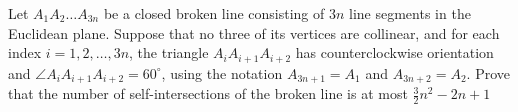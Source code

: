 Let \(A_{1}A_{2} \dots A_{3n}\) be a closed broken line consisting of \(3n\) line segments in the Euclidean plane. Suppose that no three of its vertices are collinear, and for each index \(i=1,2,\dots,3n\), the triangle \(A_{i}A_{i+1}A_{i+2}\) has counterclockwise orientation and \(\angle A_{i}A_{i+1}A_{i+2} = 60^\circ\), using the notation \(A_{3n+1} = A_{1}\) and \(A_{3n+2} = A_{2}\). Prove that the number of self-intersections of the broken line is at most \(\frac{3}{2}n^{2} - 2n + 1\)
